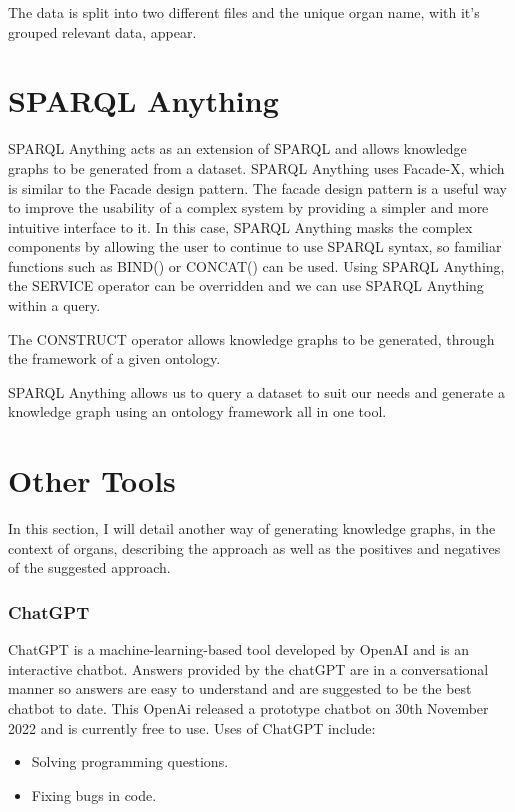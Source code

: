 The data is split into two different files and the unique organ name, with it's grouped relevant data, appear.  

\section{SPARQL Anything}
\hspace{0.5cm} SPARQL Anything acts as an extension of SPARQL and allows knowledge graphs to be generated from a dataset. SPARQL Anything uses Facade-X, which is similar to the Facade design pattern. The facade design pattern is a useful way to improve the usability of a complex system by providing a simpler and more intuitive interface to it. In this case, SPARQL Anything masks the complex components by allowing the user to continue to use SPARQL syntax, so familiar functions such as BIND() or CONCAT() can be used. Using SPARQL Anything, the SERVICE operator can be overridden and we can use SPARQL Anything within a query. \cite{sparqlanything}

The CONSTRUCT operator allows knowledge graphs to be generated, through the framework of a given ontology. \cite{sparqlanythinggithub}

SPARQL Anything allows us to query a dataset to suit our needs and generate a knowledge graph using an ontology framework all in one tool. \cite{sparqlanythinggithub}

\section{Other Tools}

\hspace{0.5cm} In this section, I will detail another way of generating knowledge graphs, in the context of organs, describing the approach as well as the positives and negatives of the suggested approach.

\subsubsection{ChatGPT}
\hspace{0.5cm}  ChatGPT is a machine-learning-based tool developed by OpenAI and is an interactive chatbot. Answers provided by the chatGPT are in a conversational manner so answers are easy to understand and are suggested to be the best chatbot to date. \cite{chatgpt} This OpenAi released a prototype chatbot on 30th November 2022 and is currently free to use. Uses of ChatGPT include:
\begin{itemize}
\item Solving programming questions.
\item Fixing bugs in code.
\end{itemize}

